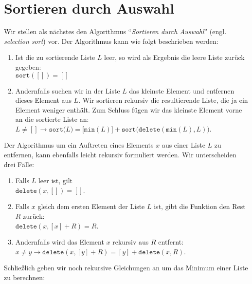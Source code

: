 \section{Sortieren durch Auswahl}
Wir stellen als n\"achstes den Algorithmus ``\emph{Sortieren durch Auswahl}''
(engl. \emph{selection sort}) vor.  Der Algorithmus kann wie folgt beschrieben werden:
\begin{enumerate}
\item Ist die zu sortierende Liste $L$ leer, so wird als Ergebnis
      die leere Liste zur\"uck gegeben: \\[0.1cm]
      \hspace*{1.3cm} $\mathtt{sort}([]) = []$
\item Andernfalls suchen wir in der Liste $L$ das kleinste Element und entfernen dieses
      Element aus $L$.  Wir sortieren rekursiv die resultierende Liste, die ja ein Element
      weniger enth\"alt.  Zum Schluss f\"ugen wir das kleinste Element vorne an die sortierte
      Liste an: \\[0.1cm]
      \hspace*{1.3cm} 
      $L \not= [] \rightarrow \mathtt{sort}\bigl(L\bigr) = \bigl[\texttt{min}(L)\bigr]
      + \mathtt{sort}\bigl(\mathtt{delete}(\texttt{min}(L), L)\bigr)$.
\end{enumerate}
Der Algorithmus um ein Auftreten eines Elements $x$ aus einer Liste $L$ zu entfernen, kann ebenfalls leicht rekursiv
formuliert werden. Wir unterscheiden drei F\"alle:
\begin{enumerate}
\item Falls $L$ leer ist, gilt \\[0.1cm]
      \hspace*{1.3cm} $\mathtt{delete}(x, []) = []$.
\item Falls $x$ gleich dem ersten Element der Liste $L$ ist, gibt die Funktion den Rest
      $R$ zur\"uck: \\[0.1cm]
      \hspace*{1.3cm} 
      $\mathtt{delete}(x, [x] + R) = R$.
\item Andernfalls wird das Element $x$ rekursiv aus $R$ entfernt: \\[0.1cm]
      \hspace*{1.3cm}   
      $x \not = y \rightarrow \mathtt{delete}(x, [y] + R) = [y] + \mathtt{delete}(x,R)$.
\end{enumerate}
Schlie\ss{}lich geben wir noch rekursive Gleichungen an um das Minimum einer Liste zu berechnen:
